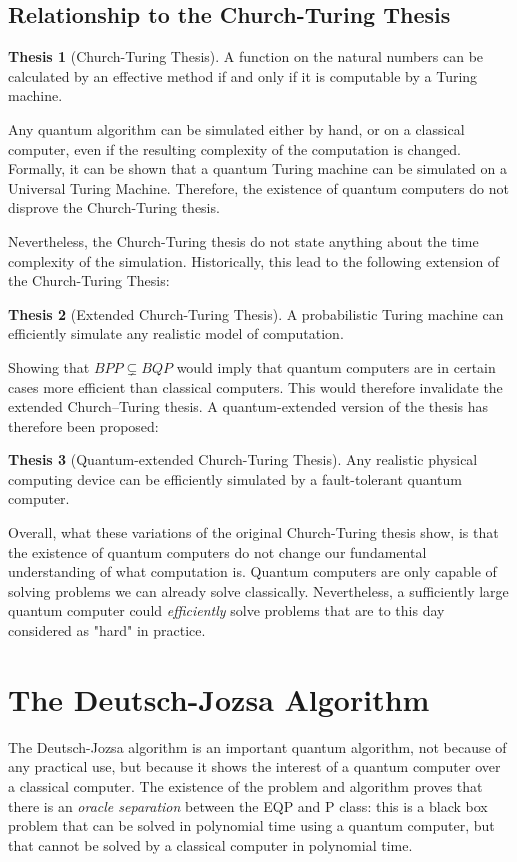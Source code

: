 \documentclass[12pt,a4paper]{article}
\theoremstyle{plain}
\theoremstyle{definition}
\newtheorem*{thesis}{Thesis}
\begin{document}
\subsection{Relationship to the Church-Turing Thesis}
\begin{thesis}[Church-Turing Thesis]
    A function on the natural numbers can be calculated by an effective method if and only if it is computable by a Turing machine.
\end{thesis}

Any quantum algorithm can be simulated either by hand, or on a classical computer, even if the resulting complexity of the computation is changed. Formally, it can be shown that a quantum Turing machine can be simulated on a Universal Turing Machine. Therefore, the existence of quantum computers do not disprove the Church-Turing thesis.

Nevertheless, the Church-Turing thesis do not state anything about the time complexity of the simulation. Historically, this lead to the following extension of the Church-Turing Thesis:
\begin{thesis}[Extended Church-Turing Thesis]
    A probabilistic Turing machine can efficiently simulate any realistic model of computation.
\end{thesis}

Showing that $BPP \varsubsetneq BQP$ would imply that quantum computers are in certain cases more efficient than classical computers. This would therefore invalidate the extended Church–Turing thesis. A quantum-extended version of the thesis has therefore been proposed\cite{quantum-applied}:
\begin{thesis}[Quantum-extended Church-Turing Thesis]
    Any realistic physical computing device can be efficiently simulated by a fault-tolerant quantum computer.
\end{thesis}

Overall, what these variations of the original Church-Turing thesis show, is that the existence of quantum computers do not change our fundamental understanding of what computation is. Quantum computers are only capable of solving problems we can already solve classically. Nevertheless, a sufficiently large quantum computer could \emph{efficiently} solve problems that are to this day considered as "hard" in practice. 

\section{The Deutsch-Jozsa Algorithm}
The Deutsch-Jozsa algorithm\cite{deutsch-jozsa} is an important quantum algorithm, not because of any practical use, but because it shows the interest of a quantum computer over a classical computer. The existence of the problem and algorithm proves that there is an \emph{oracle separation} between the EQP and P class: this is a black box problem that can be solved in polynomial time using a quantum computer, but that cannot be solved by a classical computer in polynomial time.
\end{document}
